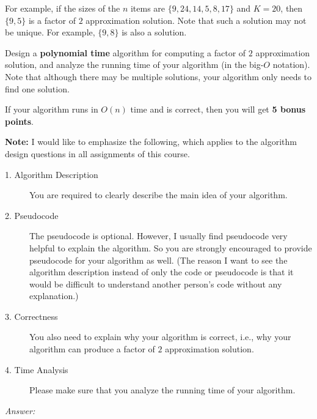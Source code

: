 \documentclass[11pt]{article}
\begin{document}
\begin{enumerate}
For example, if the sizes of the $n$ items are $\{9, 24, 14, 5, 8, 17\}$ and $K=20$, then $\{9, 5\}$ is a factor of $2$ approximation solution. Note that such a solution may not be unique. For example, $\{9, 8\}$ is also a solution. 

Design a {\bf polynomial time} algorithm for computing a factor of $2$ approximation solution, and analyze the running time of your algorithm (in the big-$O$ notation). Note that although there may be multiple solutions, your algorithm only needs to find one solution. 

If your
algorithm runs in $O(n)$ time and is correct, then you will get {\bf 5 bonus points}.

\vspace{0.2in}

{\bf Note:} I would like to emphasize the following, which applies to the algorithm design questions in all assignments of this course.

\begin{description}
\item[1. Algorithm Description]
You are required to clearly describe the main idea of your algorithm.

\item[2. Pseudocode]
The pseudocode is optional. However, I usually find pseudocode very helpful to explain the algorithm. So you are strongly encouraged to provide pseudocode for your algorithm as well. (The reason I want to see the algorithm description instead of only the code or pseudocode is that it would be difficult to understand another person's code without any explanation.)

\item[3. Correctness]
You also need to explain why your algorithm is correct, i.e., why your algorithm can produce a factor of $2$ approximation solution.

\item[4. Time Analysis]
Please make sure that you analyze the running time of your algorithm.
\end{description}

\textit{Answer:}



\end{enumerate}
\end{document}
